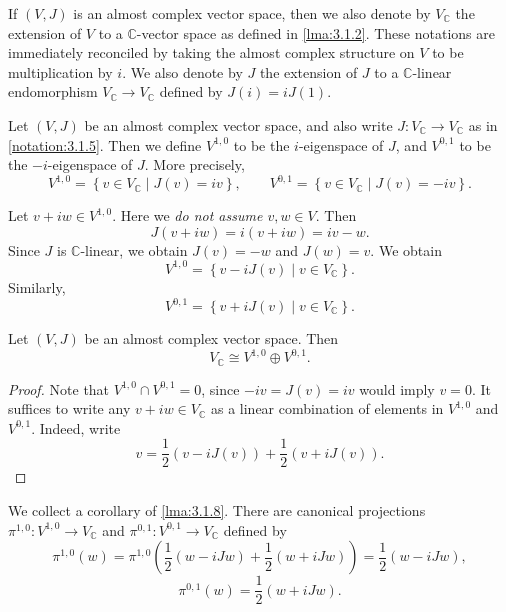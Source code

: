 \begin{notation}\label{notation:3.1.5}
	If $(V,J)$ is an almost complex vector space, then we also denote by $V_\mathbb{C} $ the extension of $V$ to a $\mathbb{C} $-vector space as defined in \cref{lma:3.1.2}. These notations are immediately reconciled by taking the almost complex structure on $V$ to be multiplication by $i$. We also denote by $J$ the extension of $J$ to a $\mathbb{C} $-linear endomorphism $V_\mathbb{C} \to V_\mathbb{C} $ defined by $J(i) = iJ(1)$.
\end{notation}

\begin{definition}\label{dfn:3.1.5}
	Let $(V,J)$ be an almost complex vector space, and also write $J : V_\mathbb{C}  \to V_\mathbb{C} $ as in \cref{notation:3.1.5}. Then we define $V^{1,0} $ to be the $i$-eigenspace of $J$, and $V^{0,1} $ to be the $-i$-eigenspace of $J$. More precisely,
	\[
		V^{1,0} =\left\{ v\in V_\mathbb{C} \mid J(v)=iv \right\} ,\qquad V^{0,1} =\left\{ v\in V_\mathbb{C} \mid J(v)=-iv \right\} 
	.\]
\end{definition}

\begin{remark}\label{rmk:3.1.6}
	Let $v+iw\in V^{1,0} $. Here we \emph{do not assume $v,w\in V$}. Then
	\[
		J(v+iw)=i(v+iw)=iv-w
	.\]
	Since $J$ is $\mathbb{C} $-linear, we obtain $J(v)=-w$ and $J(w)=v$. We obtain
	\[
		V^{1,0} =\left\{ v-iJ(v)\mid v\in V_\mathbb{C} \right\}
	.\]
	Similarly,
	\[
	V^{0,1} =\left\{ v+iJ(v)\mid v\in V_\mathbb{C} \right\} 
	.\]
\end{remark}

\begin{lemma}\label{lma:3.1.8}
	Let $(V,J)$ be an almost complex vector space. Then
	\[
		V_\mathbb{C} \cong V^{1,0} \oplus V^{0,1} 
	.\]
\end{lemma}
\begin{proof}
	Note that $V^{1,0} \cap V^{0,1} =0$, since $-iv=J(v)=iv$ would imply $v=0$. It suffices to write any $v+iw\in V_\mathbb{C} $ as a linear combination of elements in $V^{1,0} $ and $V^{0,1} $. Indeed, write
	\[
		v=\frac{1}{2} (v-iJ(v)) + \frac{1}{2} (v+iJ(v))
	.\]
\end{proof}

\begin{discussion}\label{discussion:3.1.9}
	We collect a corollary of \cref{lma:3.1.8}. There are canonical projections $\pi ^{1,0} : V^{1,0}  \to V_\mathbb{C} $ and $\pi ^{0,1} : V^{0,1}  \to V_\mathbb{C} $ defined by
\[
	\pi ^{1,0} (w) = \pi ^{1,0} \left( \frac{1}{2} (w-iJw) + \frac{1}{2} (w+iJw) \right) =\frac{1}{2} (w-iJw),
\]
\[
	\pi ^{0,1} (w) = \frac{1}{2} \left( w+iJw \right) 
.\]
\end{discussion}

